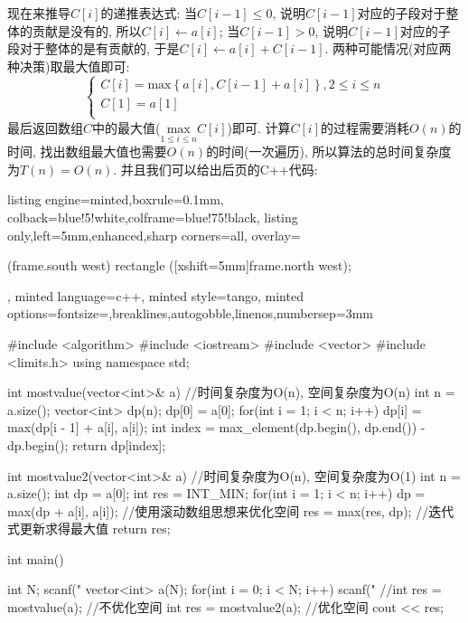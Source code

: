 \documentclass{article}
\begin{document}
\begin{homeworkProblem}
	现在来推导$C[i]$的递推表达式: 当$C[i-1]\leq 0$, 说明$C[i-1]$对应的子段对于整体的贡献是没有的, 所以$C[i]\gets a[i]$; 当$C[i-1]>0$, 说明$C[i-1]$对应的子段对于整体的是有贡献的, 于是$C[i]\gets a[i]+C[i-1]$. 两种可能情况(对应两种决策)取最大值即可:$$\begin{cases}
		C\left[ i \right] =\text{max} \left\{ a\left[ i \right] ,C\left[ i-1 \right] +a\left[ i \right] \right\} , 2\le i\le n\\
		C\left[ 1 \right] =a\left[ 1 \right]\\
	\end{cases}
	$$
	最后返回数组$C$中的最大值($\displaystyle \underset{1\le i\le n}{\text{max}}C\left[ i \right] $)即可. 计算$C[i]$的过程需要消耗$O(n)$的时间, 找出数组最大值也需要$O(n)$的时间(一次遍历), 所以算法的总时间复杂度为$T(n)=O(n)$. 并且我们可以给出后页的C++代码:
\begin{tcblisting}{listing engine=minted,boxrule=0.1mm,
colback=blue!5!white,colframe=blue!75!black,
listing only,left=5mm,enhanced,sharp corners=all,
overlay={\begin{tcbclipinterior} (frame.south west)
rectangle ([xshift=5mm]frame.north west);\end{tcbclipinterior}},
minted language=c++,
minted style=tango,
minted options={fontsize=\small,breaklines,autogobble,linenos,numbersep=3mm}}
#include <algorithm>
#include <iostream>
#include <vector>
#include <limits.h>
using namespace std;

int mostvalue(vector<int>& a) { //时间复杂度为O(n), 空间复杂度为O(n)
    int n = a.size();
    vector<int> dp(n);
    dp[0] = a[0];
    for(int i = 1; i < n; i++) {
        dp[i] = max(dp[i - 1] + a[i], a[i]);
    }
    int index = max_element(dp.begin(), dp.end()) - dp.begin();
    return dp[index];
}

int mostvalue2(vector<int>& a) {  //时间复杂度为O(n), 空间复杂度为O(1)
    int n = a.size();
    int dp = a[0];
    int res = INT_MIN;
    for(int i = 1; i < n; i++) {
        dp = max(dp + a[i], a[i]);  //使用滚动数组思想来优化空间
        res = max(res, dp); //迭代式更新求得最大值
    }
    return res;
}

int main() {
    int N;
    scanf("%
    vector<int> a(N);
    for(int i = 0; i < N; i++){
        scanf("%
    }
    //int res = mostvalue(a); //不优化空间
    int res = mostvalue2(a); //优化空间
    cout << res;
    
}
\end{tcblisting}
\end{homeworkProblem}
\end{document}
